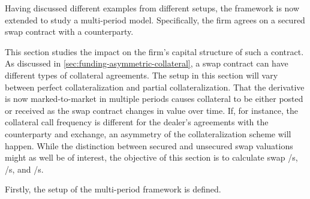 \documentclass[main.tex]{subfiles}
\begin{document}
    Having discussed different examples from different setups,
    the framework is now extended to study a multi-period model.
    Specifically, the firm agrees on a secured swap contract with a counterparty.
    
    This section studies the impact on the firm's capital structure of such a contract.
    As discussed in \cref{sec:funding-asymmetric-collateral}, a swap contract can have different types of collateral agreements.
    The setup in this section will vary between perfect collateralization and partial collateralization.
    That the derivative is now marked-to-market in multiple periods causes collateral to be either posted or received as the swap contract changes in value over time.
    If, for instance, the collateral call frequency is different for the dealer's agreements with the counterparty and exchange, an asymmetry of the collateralization scheme will happen.
    While the distinction between secured and unsecured swap valuations might as well be of interest,
    the objective of this section is to calculate swap \FVA/s, \CVA/s, and \DVA/s.

    Firstly, the setup of the multi-period framework is defined.

\end{document}
